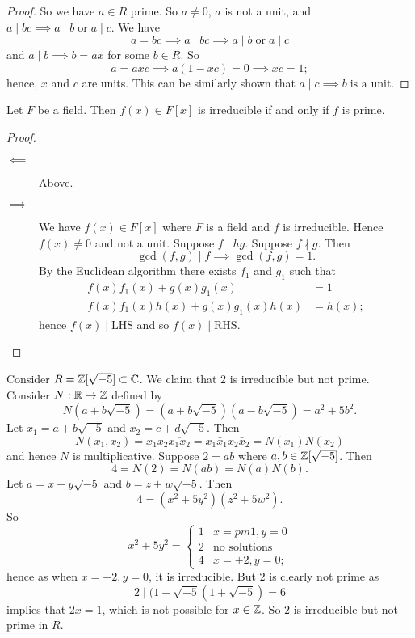 \begin{proof}
    So we have $a \in R$ prime. 
    So $a \neq 0$, $a$ is not a unit, and $a \mid bc \implies a \mid b \;\text{or}\; a \mid c$.
    We have
    \[ a = bc \implies a \mid bc \implies a \mid b \;\text{or}\; a \mid c \]
    and $a \mid b \implies b = ax$ for some $b \in R$. So
    \[ a = axc \implies a(1 - xc) = 0 \implies xc = 1; \]
    hence, $x$ and $c$ are units. This can be similarly shown that $a \mid c \implies b \;\text{is a unit}$.
\end{proof}

\begin{example}
    Let $F$ be a field. Then $f(x) \in F[x]$ is irreducible if and only if $f$ is prime.
\end{example}

\begin{proof}
    \begin{description}
        \item[$\impliedby$] Above.
        \item[$\implies$] We have $f(x) \in F[x]$ where $F$ is a field and $f$ is irreducible. 
            Hence $f(x) \neq 0$ and not a unit. 
            Suppose $f \mid hg$. 
            Suppose $f \nmid g$. Then
            \[ \gcd{(f, g)} \mid f \implies \gcd{(f, g)} = 1. \]
            By the Euclidean algorithm there exists $f_1$ and $g_1$ such that
            \begin{align*}
                f(x) f_1(x) + g(x) g_1(x)           &= 1    \\
                f(x) f_1(x) h(x) + g(x) g_1(x) h(x) &= h(x);
            \end{align*}
            hence $f(x) \mid \text{LHS}$ and so $f(x) \mid \text{RHS}$.
    \end{description}
\end{proof}

\begin{example}
    Consider $R = \mathbb{Z}[\sqrt{-5}] \subset \mathbb{C}$. We claim that $2$ is irreducible but not prime. Consider $N: \mathbb{R} \to \mathbb{Z}$ defined by
    \[ N(a + b\sqrt{-5}) = (a + b\sqrt{-5})(a - b\sqrt{-5}) = a^2 + 5b^2. \]
    Let $x_1 = a + b\sqrt{-5}$ and $x_2 = c + d\sqrt{-5}$.
    Then
    \[ N(x_1, x_2) = x_1 x_2 \overline{x_1x_2} = x_1 \bar x_1 x_2 \bar x_2 = N(x_1)N(x_2) \]
    and hence $N$ is multiplicative. Suppose $2 = ab$ where $a, b \in \mathbb{Z}[\sqrt{-5}]$.
    Then 
    \[ 4 = N(2) = N(ab) = N(a)N(b). \]
    Let $a = x + y\sqrt{-5}$ and $b = z + w\sqrt{-5}$. Then 
    \[ 4 = (x^2 + 5y^2)(z^2 + 5w^2). \]
    So
    \[
        x^2 + 5y^2 =
        \begin{cases}
            1 & x= pm 1, y = 0 \\
            2 & \text{no solutions} \\
            4 & x = \pm 2, y = 0;
        \end{cases}
    \]
    hence as when $x = \pm 2, y = 0$, it is irreducible. But $2$ is clearly not prime as
    \[ 2 \mid (1 - \sqrt{-5}(1 + \sqrt{-5}) = 6 \]
    implies that $2x = 1$, which is not possible for $x \in \mathbb{Z}$. So $2$ is irreducible but not prime in $R$.
\end{example}
